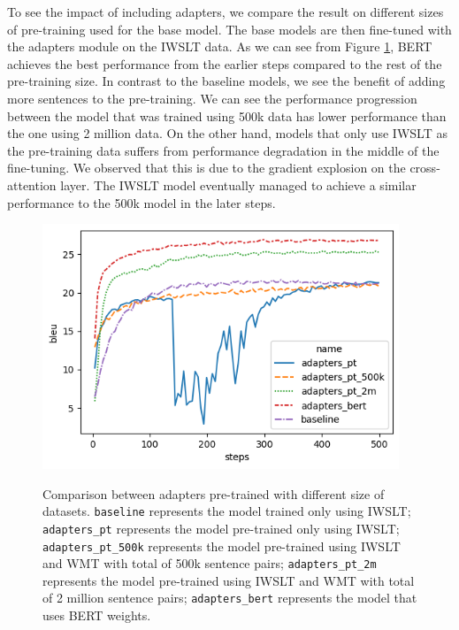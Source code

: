 To see the impact of including adapters, we compare the result on different sizes of pre-training used for the base model. The base models are then fine-tuned with the adapters module on the IWSLT data. As we can see from Figure \ref{img:adpcomp}, BERT achieves the best performance from the earlier steps compared to the rest of the pre-training size. In contrast to the baseline models, we see the benefit of adding more sentences to the pre-training. We can see the performance progression between the model that was trained using 500k data has lower performance than the one using 2 million data. On the other hand, models that only use IWSLT as the pre-training data suffers from performance degradation in the middle of the fine-tuning. We observed that this is due to the gradient explosion on the cross-attention layer. The IWSLT model eventually managed to achieve a similar performance to the 500k model in the later steps.
\begin{figure}[h]
    {\includegraphics[width=0.95\textwidth]{img/adapterscomparison.png}}
    \centering
    \caption{
        Comparison between adapters pre-trained with different size of datasets. \texttt{baseline} represents the model trained only using IWSLT; \texttt{adapters\_pt} represents the model pre-trained only using IWSLT; \texttt{adapters\_pt\_500k} represents the model pre-trained using IWSLT and WMT with total of 500k sentence pairs; \texttt{adapters\_pt\_2m} represents the model pre-trained using IWSLT and WMT with total of 2 million sentence pairs; \texttt{adapters\_bert} represents the model that uses BERT weights.}
    \label{img:adpcomp}
\end{figure}

